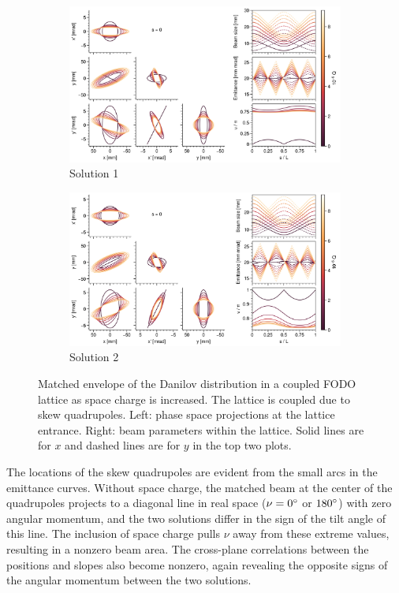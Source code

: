 \begin{figure}[!p]
    \begin{subfigure}{1.0\textwidth}
        \includegraphics[width=\textwidth]{Images/chapter2/matched_vs_sc_fodo_skew_mode1.png}
        \caption{Solution 1}
        \label{fig:matched_vs_sc_fodo_skew_a}
    \end{subfigure}
    \vfill
    \vfill
    \begin{subfigure}{1.0\textwidth}
        \centering
        \includegraphics[width=\textwidth]{Images/chapter2/matched_vs_sc_fodo_skew_mode2.png}
        \caption{Solution 2}
        \label{fig:matched_vs_sc_fodo_skew_b}
    \end{subfigure}
    \caption{Matched envelope of the Danilov distribution in a coupled FODO lattice as space  charge is increased. The lattice is coupled due to skew quadrupoles. Left: phase space projections at the lattice entrance. Right: beam parameters within the lattice. Solid lines are for $x$ and dashed lines are for $y$ in the top two plots.}
    \label{fig:matched_vs_sc_fodo_skew}
\end{figure}
%
The locations of the skew quadrupoles are evident from the small arcs in the emittance curves. Without space charge, the matched beam at the center of the quadrupoles projects to a diagonal line in real space ($\nu = 0\degree$ or $180\degree$) with zero angular momentum, and the two solutions differ in the sign of the tilt angle of this line. The inclusion of space charge pulls $\nu$ away from these extreme values, resulting in a nonzero beam area. The cross-plane correlations between the positions and slopes also become nonzero, again revealing the opposite signs of the angular momentum between the two solutions. 

